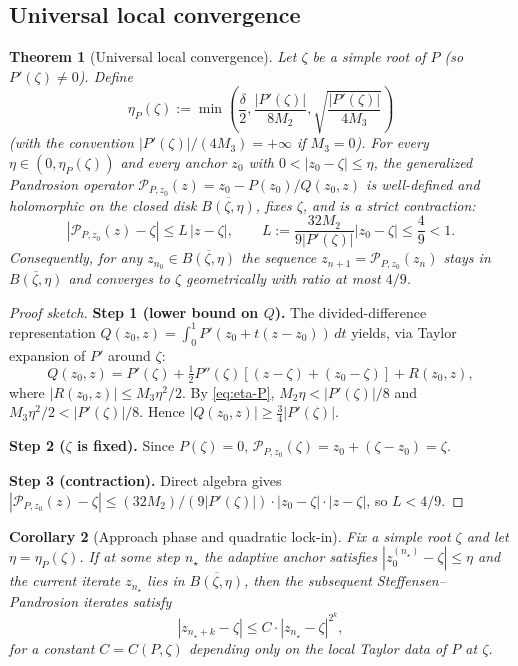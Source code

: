 \documentclass[11pt,a4paper]{article}
\newtheorem{theorem}{Theorem}[section]
\newtheorem{corollary}[theorem]{Corollary}
\begin{document}
\subsection{Universal local convergence}

\begin{theorem}[Universal local convergence]\label{thm:univ-conv}
Let $\zeta$ be a simple root of $P$ (so $P'(\zeta) \ne 0$). Define
\begin{equation}
\eta_P(\zeta) := \min\!\left( \frac{\delta}{2}, \frac{|P'(\zeta)|}{8 M_2}, \sqrt{\frac{|P'(\zeta)|}{4 M_3}} \right)
\label{eq:eta-P}
\end{equation}
(with the convention $|P'(\zeta)|/(4 M_3) = +\infty$ if $M_3 = 0$). For every $\eta \in (0, \eta_P(\zeta))$ and every anchor $z_0$ with $0 < |z_0 - \zeta| \le \eta$, the generalized Pandrosion operator $\mathcal{P}_{P, z_0}(z) = z_0 - P(z_0)/Q(z_0, z)$ is well-defined and holomorphic on the closed disk $\overline{B(\zeta, \eta)}$, fixes $\zeta$, and is a strict contraction:
\begin{equation}
|\mathcal{P}_{P, z_0}(z) - \zeta| \le L\, |z - \zeta|, \qquad L := \frac{32 M_2}{9 |P'(\zeta)|} |z_0 - \zeta| \le \frac{4}{9} < 1.
\end{equation}
Consequently, for any $z_{n_0} \in \overline{B(\zeta, \eta)}$ the sequence $z_{n+1} = \mathcal{P}_{P, z_0}(z_n)$ stays in $\overline{B(\zeta, \eta)}$ and converges to $\zeta$ geometrically with ratio at most $4/9$.
\end{theorem}

\begin{proof}[Proof sketch]
\textbf{Step 1 (lower bound on $Q$).} The divided-difference representation $Q(z_0, z) = \int_0^1 P'(z_0 + t(z - z_0))\, dt$ yields, via Taylor expansion of $P'$ around $\zeta$:
$$ Q(z_0, z) = P'(\zeta) + \tfrac{1}{2} P''(\zeta)[(z - \zeta) + (z_0 - \zeta)] + R(z_0, z), $$
where $|R(z_0, z)| \le M_3 \eta^2/2$. By \eqref{eq:eta-P}, $M_2 \eta < |P'(\zeta)|/8$ and $M_3 \eta^2/2 < |P'(\zeta)|/8$. Hence $|Q(z_0, z)| \ge \tfrac{3}{4}|P'(\zeta)|$.

\textbf{Step 2 ($\zeta$ is fixed).} Since $P(\zeta) = 0$, $\mathcal{P}_{P, z_0}(\zeta) = z_0 + (\zeta - z_0) = \zeta$.

\textbf{Step 3 (contraction).} Direct algebra gives $|\mathcal{P}_{P, z_0}(z) - \zeta| \le (32 M_2)/(9 |P'(\zeta)|) \cdot |z_0 - \zeta| \cdot |z - \zeta|$, so $L < 4/9$.
\end{proof}

\begin{corollary}[Approach phase and quadratic lock-in]
Fix a simple root $\zeta$ and let $\eta = \eta_P(\zeta)$. If at some step $n_\star$ the adaptive anchor satisfies $|z_0^{(n_\star)} - \zeta| \le \eta$ and the current iterate $z_{n_\star}$ lies in $\overline{B(\zeta, \eta)}$, then the subsequent Steffensen--Pandrosion iterates satisfy
\begin{equation}
|z_{n_\star + k} - \zeta| \le C \cdot |z_{n_\star} - \zeta|^{2^k},
\label{eq:quad-lock}
\end{equation}
for a constant $C = C(P, \zeta)$ depending only on the local Taylor data of $P$ at $\zeta$.
\end{corollary}
\end{document}
